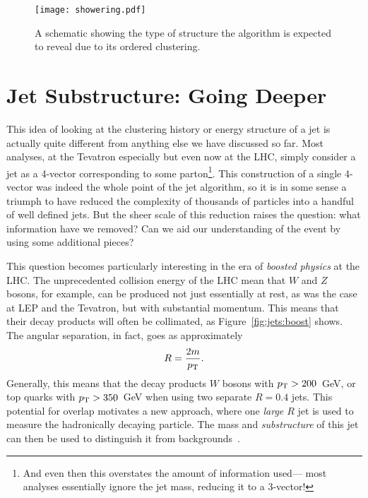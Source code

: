 
\begin{figure}
\centering
\texttt{[image: showering.pdf]}
\label{fig:jets:showering}
\caption{A schematic showing the type of structure the \kt algorithm is expected to reveal due to its \pt ordered clustering.}
\end{figure}



\section{Jet Substructure: Going Deeper}

This idea of looking at the clustering history or energy structure  of a jet is actually quite different from anything else we have discussed so far. Most analyses, at the Tevatron especially but even now at the LHC, simply consider a jet as a 4-vector corresponding to some parton\footnote{And even then this overstates the amount of information used--- most analyses essentially ignore the jet mass, reducing it to a 3-vector!}. This construction of a single 4-vector was indeed the whole point of the jet algorithm, so it is in some sense a triumph to have reduced the complexity of thousands of particles into a handful of well defined jets. But the sheer scale of this reduction raises the question: what information have we removed? Can we aid our understanding of the event by using some additional pieces?

This question becomes particularly interesting in the era of \textit{boosted physics} at the LHC. The unprecedented collision energy of the LHC mean that $W$ and $Z$ bosons, for example, can be produced not just essentially at rest, as was the case at LEP and the Tevatron, but with substantial momentum. This means that their decay products will often be collimated, as Figure~\ref{fig:jets:boost} shows. The angular separation, in fact, goes as approximately 
%
\begin{equation}
R = \frac{2 m}{p_{\text{T}}}.
\end{equation}
%
Generally, this means that the decay products $W$ bosons with $p_{\text{T}} > 200$~GeV, or top quarks with $p_{\text{T}} > 350$~GeV when using two separate $R=0.4$ jets. This potential for overlap motivates a new approach, where one \textit{large $R$} jet is used to measure the hadronically decaying particle. The mass and \textit{substructure} of this jet can then be used to distinguish it from backgrounds~\cite{Jetography}.

